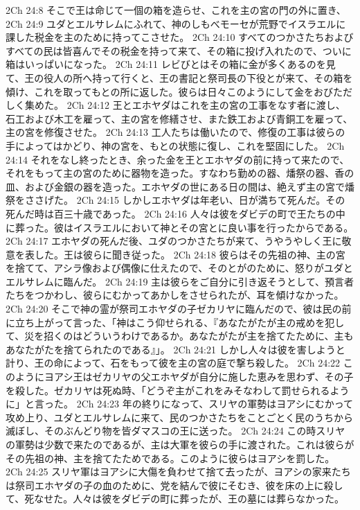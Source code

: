2Ch 24:8  そこで王は命じて一個の箱を造らせ、これを主の宮の門の外に置き、
2Ch 24:9  ユダとエルサレムにふれて、神のしもべモーセが荒野でイスラエルに課した税金を主のために持ってこさせた。
2Ch 24:10  すべてのつかさたちおよびすべての民は皆喜んでその税金を持って来て、その箱に投げ入れたので、ついに箱はいっぱいになった。
2Ch 24:11  レビびとはその箱に金が多くあるのを見て、王の役人の所へ持って行くと、王の書記と祭司長の下役とが来て、その箱を傾け、これを取ってもとの所に返した。彼らは日々このようにして金をおびただしく集めた。
2Ch 24:12  王とエホヤダはこれを主の宮の工事をなす者に渡し、石工および木工を雇って、主の宮を修繕させ、また鉄工および青銅工を雇って、主の宮を修復させた。
2Ch 24:13  工人たちは働いたので、修復の工事は彼らの手によってはかどり、神の宮を、もとの状態に復し、これを堅固にした。
2Ch 24:14  それをなし終ったとき、余った金を王とエホヤダの前に持って来たので、それをもって主の宮のために器物を造った。すなわち勤めの器、燔祭の器、香の皿、および金銀の器を造った。エホヤダの世にある日の間は、絶えず主の宮で燔祭をささげた。
2Ch 24:15  しかしエホヤダは年老い、日が満ちて死んだ。その死んだ時は百三十歳であった。
2Ch 24:16  人々は彼をダビデの町で王たちの中に葬った。彼はイスラエルにおいて神とその宮とに良い事を行ったからである。
2Ch 24:17  エホヤダの死んだ後、ユダのつかさたちが来て、うやうやしく王に敬意を表した。王は彼らに聞き従った。
2Ch 24:18  彼らはその先祖の神、主の宮を捨てて、アシラ像および偶像に仕えたので、そのとがのために、怒りがユダとエルサレムに臨んだ。
2Ch 24:19  主は彼らをご自分に引き返そうとして、預言者たちをつかわし、彼らにむかってあかしをさせられたが、耳を傾けなかった。
2Ch 24:20  そこで神の霊が祭司エホヤダの子ゼカリヤに臨んだので、彼は民の前に立ち上がって言った、「神はこう仰せられる、『あなたがたが主の戒めを犯して、災を招くのはどういうわけであるか。あなたがたが主を捨てたために、主もあなたがたを捨てられたのである』」。
2Ch 24:21  しかし人々は彼を害しようと計り、王の命によって、石をもって彼を主の宮の庭で撃ち殺した。
2Ch 24:22  このようにヨアシ王はゼカリヤの父エホヤダが自分に施した恵みを思わず、その子を殺した。ゼカリヤは死ぬ時、「どうぞ主がこれをみそなわして罰せられるように」と言った。
2Ch 24:23  年の終りになって、スリヤの軍勢はヨアシにむかって攻め上り、ユダとエルサレムに来て、民のつかさたちをことごとく民のうちから滅ぼし、そのぶんどり物を皆ダマスコの王に送った。
2Ch 24:24  この時スリヤの軍勢は少数で来たのであるが、主は大軍を彼らの手に渡された。これは彼らがその先祖の神、主を捨てたためである。このように彼らはヨアシを罰した。
2Ch 24:25  スリヤ軍はヨアシに大傷を負わせて捨て去ったが、ヨアシの家来たちは祭司エホヤダの子の血のために、党を結んで彼にそむき、彼を床の上に殺して、死なせた。人々は彼をダビデの町に葬ったが、王の墓には葬らなかった。
